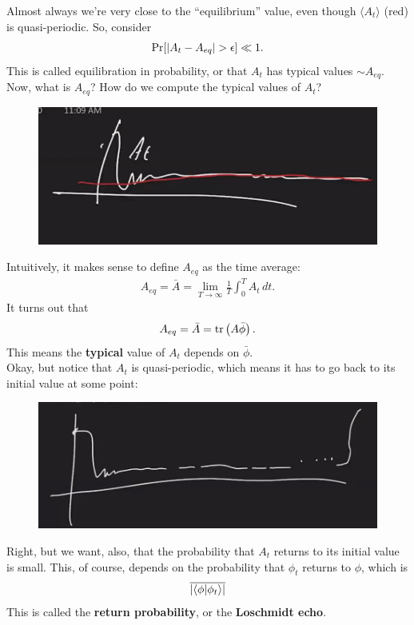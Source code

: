 \documentclass{book}
\theoremstyle{definition}
\newcommand{\f}[2]{\frac{#1}{#2}}
\newcommand{\lp}{\left(}
\newcommand{\rp}{\right)}
\begin{document}
Almost always we're very close to the ``equilibrium'' value, even though $\langle A_t\rangle$ (red) is quasi-periodic. So, consider 
\begin{align}
\Pr[\abs{A_t - A_{eq}} > \epsilon] \ll 1.
\end{align} 
This is called equilibration in probability, or that $A_t$ has typical values $\sim A_{eq}$. Now, what is $A_{eq}$? How do we compute the typical values of $A_t$? 
\begin{figure}[!htb]
	\centering
	\includegraphics[scale=0.3]{typical}
\end{figure}

Intuitively, it makes sense to define $A_{eq}$ as the time average: 
\begin{align}
A_{eq} = \bar{A} = \lim_{T\to \infty}\f{1}{T}\int^T_0 A_t \,dt.
\end{align}
It turns out that
\begin{align}
A_{eq} = \bar{A} = \tr\lp A \bar{\phi} \rp.
\end{align}
This means the \textbf{typical} value of $A_t$ depends on $\bar{\phi}$.\\

Okay, but notice that $A_t$ is quasi-periodic, which means it has to go back to its initial value at some point:
\begin{figure}[!htb]
	\centering
	\includegraphics[scale=0.3]{quasi2}
\end{figure}
Right, but we want, also, that the probability that $A_t$ returns to its initial value is small. This, of course, depends on the probability that $\phi_t$ returns to $\phi$, which is 
\begin{align}
\overline{\abs{\braket{\phi}{\phi_t}}}
\end{align} 
This is called the \textbf{return probability}, or the \textbf{Loschmidt echo}.       \\
\end{document}
